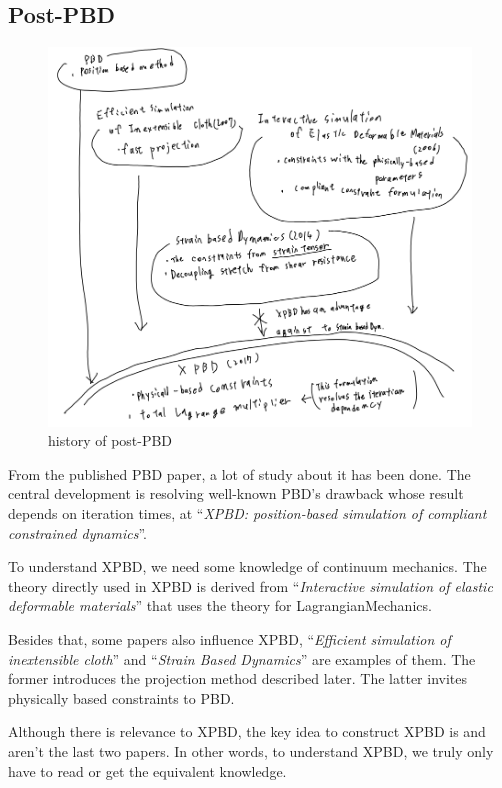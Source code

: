 \documentclass[pdflatex,sn-mathphys-num]{sn-jnl}%
\theoremstyle{thmstyleone}%
\theoremstyle{thmstyletwo}%
\theoremstyle{thmstylethree}%
\newcommand{\mainpname}[1]{``{\sl {#1}}''}
\begin{document}
\subsection{Post-PBD}
\begin{figure}[h]
	\centering
	\includegraphics[width=1\textwidth]{images/postPBD.png}
	\caption{history of post-PBD}
		\label{postPBD}
\end{figure}

From the published PBD paper, a lot of study about it has been done.
The central development is resolving well-known PBD's drawback whose result depends on \gls{iteration} times, at \mainpname{XPBD: position-based simulation of compliant constrained dynamics}\cite{XPBD}.

To understand XPBD, we need some knowledge of continuum mechanics.
The theory directly used in XPBD is derived from \mainpname{Interactive simulation of elastic deformable materials}\cite{Servin2006InteractiveSO} that uses the theory for \gls{LagrangianMechanics}.

Besides that, some papers also influence XPBD, \mainpname{Efficient simulation of inextensible cloth}\cite{EfficientGoldenthai} and \mainpname{Strain Based Dynamics}\cite{StrainBasedDyn} are examples of them.
The former introduces the projection method described later. The latter invites physically based constraints to PBD.

Although there is relevance to XPBD, the key idea to construct XPBD is \cite{Servin2006InteractiveSO} and aren't the last two papers. In other words, to understand XPBD, we truly only have to read \cite{Servin2006InteractiveSO} or get the equivalent knowledge.
\end{document}
